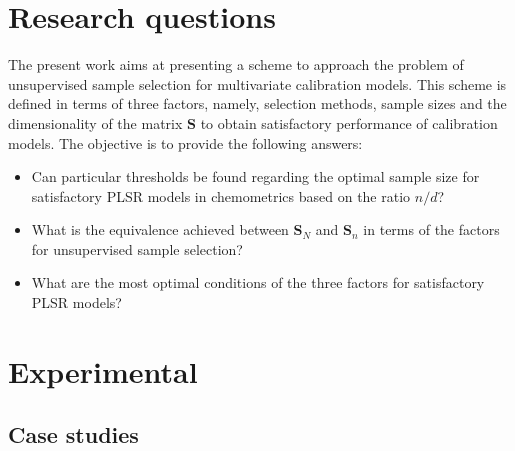 \documentclass[journal=ancham,manuscript=article]{achemso}
\begin{document}
\section{Research questions}

The present work aims at presenting a scheme to approach the problem of unsupervised sample selection for multivariate calibration models. This scheme is defined in terms of three factors, namely, selection methods, sample sizes and the dimensionality of the matrix $\mathbf{S}$ to obtain satisfactory performance of calibration models. The objective is to provide the following answers:

\begin{itemize}

    \item Can particular thresholds be found regarding the optimal sample size for satisfactory PLSR models in chemometrics based on the ratio $n/d$?

    \item What is the equivalence achieved between $\mathbf{S}_N$ and $\mathbf{S}_n$ in terms of the factors for unsupervised sample selection?
    
    \item What are the most optimal conditions of the three factors for satisfactory PLSR models?

\end{itemize}


\section{Experimental}\label{experimental}

\subsection{Case studies}\label{data}
\end{document}
